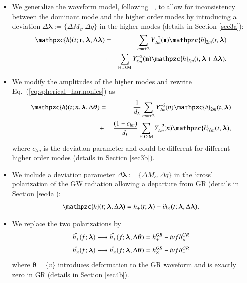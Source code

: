 \documentclass[prd,preprintnumbers,twocolumn,eqsecnum,floatfix,a4paper,nofootinbib,superscriptaddress]{revtex4}
\newcommand{\h}{\mathpzc{h}}
\newcommand{\hlm}{\mathpzc{h}_{\ell m}}
\newcommand{\Ylm}{{Y}^{-2}_{\ell m}}
\newcommand{\blambda}{\bm{\lambda}}
\newcommand{\btheta}{\bm{\theta}}
\newcommand{\n}{\mathbf{n}}
\begin{document}
\begin{itemize}
	\item We generalize the waveform model, following ~\cite{dhanpal2018}, to allow for inconsistency between the dominant mode and the higher order modes by  introducing a deviation $\Delta \blambda := \{\Delta M_c, \Delta q\}$ in the higher modes (details in Section \ref{sec3a}):
	\begin{eqnarray}
	\h(t; \n, \blambda, \Delta \blambda) & = & \sum_{m = \pm2} Y^{-2}_{2m} (\n) {\h}_{2m}(t, \blambda)  \nonumber \\ 
	& + & \sum _{\text{H.O.M}} \Ylm (\n) \hlm(t, \blambda+\Delta \blambda).
	\label{eq:test_1}
	\end{eqnarray}
	
	\item We modify the amplitudes of the higher modes and rewrite Eq.~(\ref{eq:spherical_harmonics}) as
	\begin{eqnarray}
	{\h}(t; n, \blambda, \Delta \btheta) & = & \frac{1}{d_L} \sum_{m = \pm2} Y^{-2}_{2m} (n) {\h}_{2m}(t, \blambda)  \nonumber \\ 
	& + & \frac{(1+{c_{lm}})}{d_L} \sum _{\text{H.O.M}} \Ylm (n) \hlm(t, \blambda),
	\label{eq:test_2}
	\end{eqnarray}
	where $c_{lm}$ is the deviation parameter and could be different for different higher order modes (details in Section \ref{sec3b}). 
	
	\item We include a deviation parameter $\Delta \blambda := \{\Delta M_c, \Delta q\}$ in the `cross' polarization of the GW radiation allowing a departure from GR (details in Section \ref{sec4a}):
	\begin{eqnarray} 
	\h(t; \blambda, \Delta \blambda) =  h_+(t; \blambda) - ih_\times(t; \blambda, \Delta \blambda),
	\label{eq:test_3}
	\end{eqnarray}
	
	\item We replace the two polarizations by 
	\begin{eqnarray} 
	\Hat{h_+}(f; \blambda)  \longrightarrow \Hat{h_+}(f; \blambda, \Delta \btheta) =h^{GR}_+ + i v f h^{GR}_{\times} 
	\label{eq:test_4a}
	\end{eqnarray}
	\begin{eqnarray}
\Hat{h_\times}(f; \blambda) \longrightarrow \Hat{h_\times}(f; \blambda, \Delta \btheta) =h^{GR}_\times - i v f h^{GR}_{+}
	\label{eq:test_4b}
	\end{eqnarray}
	where $\btheta=\{v\}$ introduces deformation to the GR waveform and is exactly zero in GR (details in Section \ref{sec4b}).
		
\end{itemize}
\end{document}
